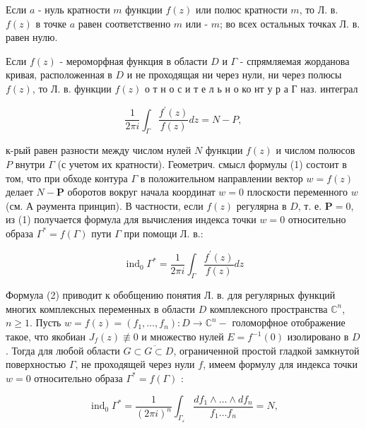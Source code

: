 \documentclass[10pt]{article}
\begin{document}
Если $a$ - нуль кратности $m$ функции $f(z)$ или полюс кратности $m$, то Л. в. $f(z)$ в точке $a$ равен соответственно $m$ или - $m$; во всех остальных точках Л. в. равен нулю.



Если $f(z)$ - мероморфная функция в области $D$ и $\Gamma$ - спрямляемая жорданова кривая, расположенная в $D$ и не проходящая ни через нули, ни через полюсы $f(z)$, то Л. в. функции $f(z)$ о т н о с и т е л ь н о ко нт у р а Г наз. интеграл



\[

\frac{1}{2 \pi i} \int_{\Gamma} \frac{f^{\prime}(z)}{f(z)} d z=N-P,

\]



к-рый равен разности между числом нулей $N$ функции $f(z)$ и числом полюсов $P$ внутри $\Gamma$ (с учетом их кратности). Геометрич. смысл формулы (1) состоит в том, что при обходе контура $\Gamma$ в положительном направлении вектор $w=f(z)$ делает $N-\boldsymbol{P}$ оборотов вокруг начала координат $w=0$ плоскости переменного $w$ (см. А рәумента принцип). В частности, если $f(z)$ регулярна в $D$, т. е. $\boldsymbol{P}=0$, из (1) получается формула для вычисления индекса точки $w=0$ относительно образа $\Gamma^{*}=f(\Gamma)$ пути $\Gamma$ при помощи Л. в.:



\[

\operatorname{ind}_{0} \Gamma^{*}=\frac{1}{2 \pi i} \int_{\Gamma} \frac{f^{\prime}(z)}{f(z)} d z

\]



Формула (2) приводит к обобщению понятия Л. в. для регулярных функций многих комплексных переменных в области $D$ комплексного пространства $\mathbb{C}^{n}$, $n \geqslant 1$. Пусть $w=f(z)=\left(f_{1}, \ldots, f_{n}\right): D \rightarrow \mathbb{C}^{n}-$ голоморфное отображение такое, что якобиан $J_{f}(z) \not \equiv 0$ и множество нулей $E=f^{-1}(0)$ изолировано в $D$. Тогда для любой области $G \subset \overline{G \subset} D$, ограниченной простой гладкой замкнутой поверхностью $\Gamma$, не проходящей через нули $f$, имеем формулу для индекса точки $w=0$ относительно образа $\Gamma^{*}=f(\Gamma)$ :



\[

\operatorname{ind}_{0} \Gamma^{*}=\frac{1}{(2 \pi i)^{n}} \int_{\Gamma_{\varepsilon}} \frac{d f_{1} \wedge \ldots \wedge d f_{n}}{f_{1} \ldots f_{n}}=N,

\]
\end{document}
